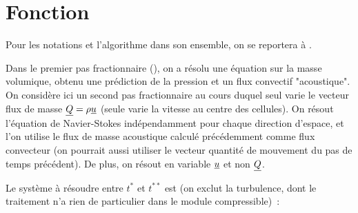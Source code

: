 %
%
%
%
%
%
%
%
%
\vspace{1cm}
\section{Fonction}

Pour les notations et l'algorithme dans son ensemble,
on se reportera \`a .

Dans le premier pas fractionnaire (), on a r\'esolu une
\'equation sur la masse volumique, obtenu une pr\'ediction de la pression
et un flux convectif "acoustique".
On consid\`ere ici un second pas fractionnaire au cours duquel seul varie
le vecteur flux de masse $\underline{Q}=\rho\underline{u}$
(seule varie la vitesse au centre des cellules).
On r\'esout l'\'equation de Navier-Stokes ind\'ependamment
pour chaque direction d'espace, et l'on utilise le flux de masse acoustique
calcul\'e pr\'ec\'edemment comme flux convecteur (on pourrait aussi utiliser
le vecteur quantit\'e de mouvement du pas de temps pr\'ec\'edent).
De plus, on r\'esout en variable $\underline{u}$ et non $\underline{Q}$.

Le syst\`eme \`a r\'esoudre entre $t^*$ et $t^{**}$ est (on exclut
la turbulence, dont le traitement n'a rien de particulier dans le
module compressible)~:

